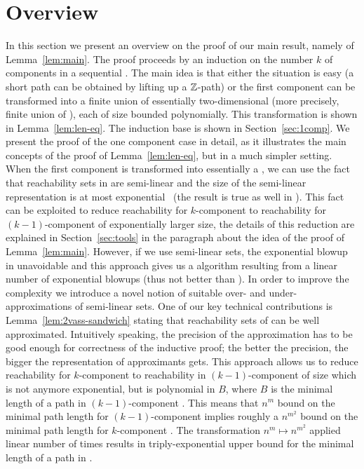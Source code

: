 
\section{Overview} \label{sec:overview}
In this section we present an overview on the proof of our main result, namely of Lemma~\ref{lem:main}.
The proof proceeds by an induction on the number $k$ of components in a sequential \tvass.
The main idea is that either the situation is easy (a short path can be obtained by lifting up a $\mathbb{Z}$-path)
or the first component can be transformed into a finite union of essentially two-dimensional \vass (more precisely,
finite union of \geomvass), each of size bounded polynomially. This transformation is shown in Lemma~\ref{lem:len-eq}.
The induction base is shown in Section~\ref{sec:1comp}. We present the proof of the one component case in detail,
as it illustrates the main concepts of the proof of Lemma~\ref{lem:len-eq}, but in a much simpler setting.
When the first component is transformed into essentially a \dvass, we can use the fact that
reachability sets in \dvass are semi-linear and the size of the semi-linear representation
is at most exponential~\cite{BlondinFGHM15} (the result is true as well in \geomvass).
This fact can be exploited to reduce reachability for $k$-component \tvass to reachability for $(k-1)$-component \tvass
of exponentially larger size, the details of this reduction are explained in Section~\ref{sec:tools}
in the paragraph about the idea of the proof of Lemma~\ref{lem:main}.
However, if we use semi-linear sets, the exponential blowup in unavoidable and this approach gives us a \tower algorithm
resulting from a linear number of exponential blowups (thus not better than \cite{DBLP:conf/icalp/FuYZ24}).
In order to improve the complexity we introduce a novel notion of suitable over- and under-approximations of semi-linear sets.
One of our key technical contributions is Lemma~\ref{lem:2vass-sandwich} stating that reachability sets
of \dvass can be well approximated. 
Intuitively speaking, the precision of the approximation has to be good enough for correctness of the inductive proof;
the better the precision, the bigger the representation of approximants gets.
This approach allows us to reduce reachability for $k$-component \tvass to reachability in $(k-1)$-component \tvass of size which is not anymore exponential, but is polynomial in $B$,
where $B$ is the minimal length of a path in $(k-1)$-component \tvass.
This means that $n^m$ bound on the minimal path length for $(k-1)$-component \tvass implies roughly a $n^{m^2}$
bound on the minimal path length for $k$-component \tvass. The transformation
$n^m \mapsto n^{m^2}$ applied linear number of times results in triply-exponential upper bound for the minimal length of a path in \tvass.

